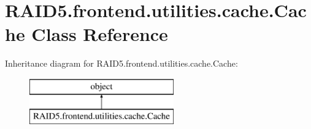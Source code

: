 \hypertarget{class_r_a_i_d5_1_1frontend_1_1utilities_1_1cache_1_1_cache}{}\section{R\+A\+I\+D5.\+frontend.\+utilities.\+cache.\+Cache Class Reference}
\label{class_r_a_i_d5_1_1frontend_1_1utilities_1_1cache_1_1_cache}
Inheritance diagram for R\+A\+I\+D5.\+frontend.\+utilities.\+cache.\+Cache\+:\begin{figure}[H]
\begin{center}
\leavevmode
\includegraphics[height=2.000000cm]{class_r_a_i_d5_1_1frontend_1_1utilities_1_1cache_1_1_cache}
\end{center}
\end{figure}
